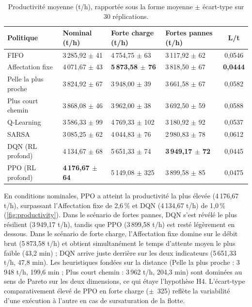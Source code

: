 \documentclass[11pt,a4paper]{article}
\begin{document}
\begin{table}[H]
\centering
\caption{Productivité moyenne (t/h), rapportée sous la forme moyenne $\pm$ écart-type sur 30 réplications.}
\label{tab:productivity}
\footnotesize\setlength{\tabcolsep}{3pt}
\begin{tabularx}{\textwidth}{@{}lXXXc@{}}
\toprule
\textbf{Politique} & \textbf{Nominal (t/h)} & \textbf{Forte charge (t/h)} & \textbf{Fortes pannes (t/h)} & \textbf{L/t} \\
\midrule
FIFO               & 3\,285,92 $\pm$ 41 & 4\,754,75 $\pm$ 63  & 3\,117,92 $\pm$ 62 & 0,0546 \\
Affectation fixe   & 4\,071,67 $\pm$ 43 & \textbf{5\,873,58 $\pm$ 76} & 3\,818,50 $\pm$ 67 & \textbf{0,0444} \\
Pelle la plus proche & 3\,824,92 $\pm$ 67 & 3\,948,00 $\pm$ 39  & 3\,661,58 $\pm$ 67 & 0,0582 \\
Plus court chemin  & 3\,868,08 $\pm$ 46 & 3\,962,00 $\pm$ 38  & 3\,692,50 $\pm$ 59 & 0,0588 \\
Q-Learning         & 3\,586,33 $\pm$ 99 & 4\,769,33 $\pm$ 102 & 3\,180,92 $\pm$ 92 & 0,0537 \\
SARSA              & 3\,085,25 $\pm$ 62 & 4\,044,83 $\pm$ 76  & 2\,980,83 $\pm$ 78 & 0,0612 \\
DQN (RL profond)   & 4\,134,67 $\pm$ 68 & 5\,651,33 $\pm$ 74  & \textbf{3\,949,17 $\pm$ 72} & 0,0445 \\
PPO (RL profond)   & \textbf{4\,176,67 $\pm$ 64} & 5\,149,08 $\pm$ 325 & 3\,899,58 $\pm$ 85 & 0,0475 \\
\bottomrule
\end{tabularx}
\end{table}

En conditions nominales, PPO a atteint la productivité la plus élevée (4\,176,67 t/h), surpassant l'Affectation fixe de 2,6\,\% et DQN (4\,134,67 t/h) de 1,0\,\% (\cref{fig:productivity}). Dans le scénario de fortes pannes, DQN s'est révélé le plus résilient (3\,949,17 t/h), tandis que PPO (3\,899,58 t/h) est resté légèrement en dessous. Dans le scénario de forte charge, l'Affectation fixe domine sur le débit brut (5\,873,58 t/h) et obtient simultanément le temps d'attente moyen le plus faible (43,2 min) ; DQN arrive juste derrière sur les deux indicateurs (5\,651,33 t/h, 47,8 min). Les heuristiques fondées sur la distance (Pelle la plus proche : 3\,948 t/h, 199,6 min ; Plus court chemin : 3\,962 t/h, 204,3 min) sont dominées au sens de Pareto sur les deux dimensions, ce qui étaye l'hypothèse H4. L'écart-type comparativement élevé de PPO en forte charge ($\pm$~325) reflète la variabilité d'une exécution à l'autre en cas de sursaturation de la flotte.
\end{document}

